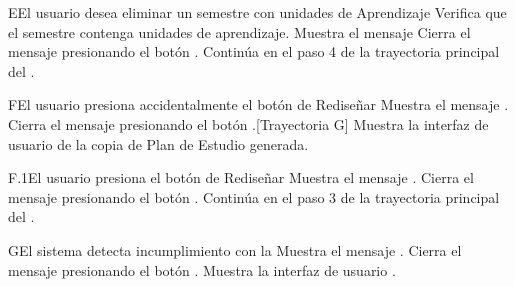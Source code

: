 \begin{UCtrayectoriaA}{E}{El usuario desea eliminar un semestre con unidades de Aprendizaje}
	\UCpaso Verifica que el semestre contenga unidades de aprendizaje.
	\UCpaso Muestra el mensaje 
	\UCpaso[\UCactor] Cierra el mensaje presionando el botón .
	\UCpaso Continúa en el paso 4 de la trayectoria principal del .
\end{UCtrayectoriaA}

\begin{UCtrayectoriaA}{F}{El usuario presiona accidentalmente el botón \BtnLapiz de Rediseñar}
	\UCpaso  Muestra el mensaje .
	\UCpaso[\UCactor] Cierra el mensaje presionando el botón .[Trayectoria G]
	\UCpaso Muestra la interfaz de usuario  de la copia de Plan de Estudio generada.
\end{UCtrayectoriaA}
\begin{UCtrayectoriaA}{F.1}{El usuario presiona el botón \BtnLapiz de Rediseñar}
	\UCpaso  Muestra el mensaje .
	\UCpaso[\UCactor] Cierra el mensaje presionando el botón .
	\UCpaso Continúa en el paso 3 de la trayectoria principal del .
\end{UCtrayectoriaA}

\begin{UCtrayectoriaA}{G}{El sistema detecta incumplimiento con la  }
	\UCpaso Muestra el mensaje .
	\UCpaso[\UCactor] Cierra el mensaje presionando el botón .
	\UCpaso Muestra la interfaz de usuario .
\end{UCtrayectoriaA}

